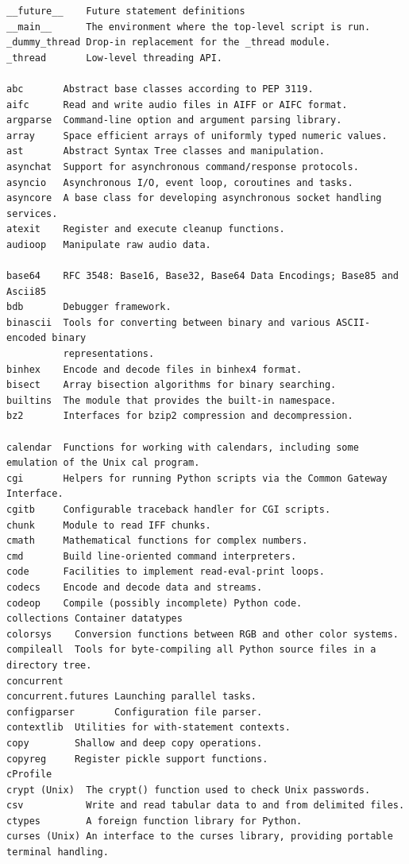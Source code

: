 \documentclass[9pt,a4wide]{extarticle}
\begin{document}
\begin{verbatim}
__future__    Future statement definitions
__main__      The environment where the top-level script is run.
_dummy_thread Drop-in replacement for the _thread module.
_thread       Low-level threading API.

abc       Abstract base classes according to PEP 3119.
aifc      Read and write audio files in AIFF or AIFC format.
argparse  Command-line option and argument parsing library.
array     Space efficient arrays of uniformly typed numeric values.
ast       Abstract Syntax Tree classes and manipulation.
asynchat  Support for asynchronous command/response protocols.
asyncio   Asynchronous I/O, event loop, coroutines and tasks.
asyncore  A base class for developing asynchronous socket handling services.
atexit    Register and execute cleanup functions.
audioop   Manipulate raw audio data.

base64    RFC 3548: Base16, Base32, Base64 Data Encodings; Base85 and Ascii85
bdb       Debugger framework.
binascii  Tools for converting between binary and various ASCII-encoded binary 
          representations.
binhex    Encode and decode files in binhex4 format.
bisect    Array bisection algorithms for binary searching.
builtins  The module that provides the built-in namespace.
bz2       Interfaces for bzip2 compression and decompression.

calendar  Functions for working with calendars, including some emulation of the Unix cal program.
cgi       Helpers for running Python scripts via the Common Gateway Interface.
cgitb     Configurable traceback handler for CGI scripts.
chunk     Module to read IFF chunks.
cmath     Mathematical functions for complex numbers.
cmd       Build line-oriented command interpreters.
code      Facilities to implement read-eval-print loops.
codecs    Encode and decode data and streams.
codeop    Compile (possibly incomplete) Python code.
collections Container datatypes
colorsys    Conversion functions between RGB and other color systems.
compileall  Tools for byte-compiling all Python source files in a directory tree.
concurrent  
concurrent.futures Launching parallel tasks.
configparser       Configuration file parser.
contextlib  Utilities for with-statement contexts.
copy        Shallow and deep copy operations.
copyreg     Register pickle support functions.
cProfile    
crypt (Unix)  The crypt() function used to check Unix passwords.
csv           Write and read tabular data to and from delimited files.
ctypes        A foreign function library for Python.
curses (Unix) An interface to the curses library, providing portable terminal handling.


\end{verbatim}
\end{document}
